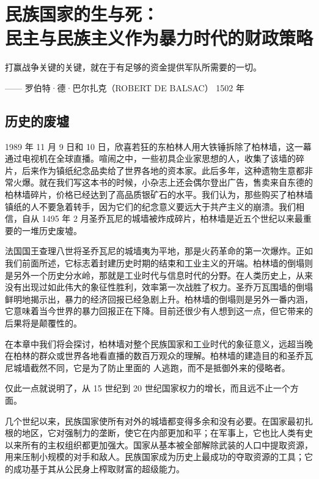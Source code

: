 \chapter[民族国家的生与死]{民族国家的生与死：\\ 民主与民族主义作为暴力时代的财政策略}

\begin{tcolorbox}
打赢战争关键的关键，就在于有足够的资金提供军队所需要的一切。
\begin{flushright}
—— 罗伯特·德·巴尔扎克（ROBERT DE BALSAC） 1502 年
\end{flushright}
\end{tcolorbox}


\section{历史的废墟}

1989 年 11 月 9 日和 10 日，欣喜若狂的东柏林人用大铁锤拆除了柏林墙，这一幕通过电视机在全球直播。喧闹之中，一些初具企业家思想的人，收集了该墙的碎片，后来作为镇纸纪念品卖给了世界各地的资本家。此后多年，这种遗物生意都非常火爆。就在我们写这本书的时候，小杂志上还会偶尔登出广告，售卖来自东德的柏林墙碎片，价格已经达到了高品质银矿石的水平。我们认为，那些购买了柏林墙镇纸的人不要急着转手，因为它们的纪念意义要远大于共产主义的崩溃。我们相信，自从 1495 年 2 月圣乔瓦尼的城墙被炸成碎片，柏林墙是近五个世纪以来最重要的一堆历史废墟。

法国国王查理八世将圣乔瓦尼的城墙夷为平地，那是火药革命的第一次爆炸。正如我们前面所述，它标志着封建历史时期的结束和工业主义的开端。柏林墙的倒塌则是另外一个历史分水岭，那就是工业时代与信息时代的分野。在人类历史上，从来没有出现过如此伟大的象征性胜利，效率第一次战胜了权力。圣乔万瓦围墙的倒塌鲜明地揭示出，暴力的经济回报已经急剧上升。柏林墙的倒塌则是另外一番内涵，它意味着当今世界的暴力回报正在下降。目前还很少有人想到这一点，但它带来的后果将是颠覆性的。

在本章中我们将会探讨，柏林墙对整个民族国家和工业时代的象征意义，远超当晚在柏林的群众或世界各地看直播的数百万观众的理解。柏林墙的建造目的和圣乔瓦尼城墙截然不同，它是为了防止里面的 人逃跑，而不是抵御外来的侵略者。

仅此一点就说明了，从 15 世纪到 20 世纪国家权力的增长，而且远不止一个方面。

几个世纪以来，民族国家使所有对外的城墙都变得多余和没有必要。在国家最初扎根的地区，它对强制力的垄断，使它在内部更加和平；在军事上，它也比人类有史以来所有的主权组织都更加强大。国家从基本被全部解除武装的人口中提取资源，用来压制小规模的对手和敌人。民族国家成为历史上最成功的夺取资源的工具；它的成功基于其从公民身上榨取财富的超级能力。


